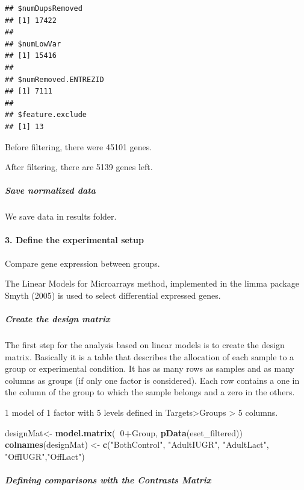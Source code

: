 \documentclass[]{article}
\newenvironment{Shaded}{\begin{snugshade}}{\end{snugshade}}
\newcommand{\KeywordTok}[1]{\textcolor[rgb]{0.13,0.29,0.53}{\textbf{#1}}}
\newcommand{\DecValTok}[1]{\textcolor[rgb]{0.00,0.00,0.81}{#1}}
\newcommand{\StringTok}[1]{\textcolor[rgb]{0.31,0.60,0.02}{#1}}
\newcommand{\OperatorTok}[1]{\textcolor[rgb]{0.81,0.36,0.00}{\textbf{#1}}}
\newcommand{\NormalTok}[1]{#1}
\let\oldparagraph\paragraph
\renewcommand{\paragraph}[1]{\oldparagraph{#1}\mbox{}}
\let\oldsubparagraph\subparagraph
\renewcommand{\subparagraph}[1]{\oldsubparagraph{#1}\mbox{}}
\begin{document}
\begin{verbatim}
## $numDupsRemoved
## [1] 17422
## 
## $numLowVar
## [1] 15416
## 
## $numRemoved.ENTREZID
## [1] 7111
## 
## $feature.exclude
## [1] 13
\end{verbatim}

Before filtering, there were 45101 genes.

After filtering, there are 5139 genes left.

\subparagraph{Save normalized data}\label{save-normalized-data}

We save data in results folder.

\paragraph{3. Define the experimental
setup}\label{define-the-experimental-setup}

Compare gene expression between groups.

The Linear Models for Microarrays method, implemented in the limma
package Smyth (2005) is used to select differential expressed genes.

\subparagraph{Create the design matrix}\label{create-the-design-matrix}

The first step for the analysis based on linear models is to create the
design matrix. Basically it is a table that describes the allocation of
each sample to a group or experimental condition. It has as many rows as
samples and as many columns as groups (if only one factor is
considered). Each row contains a one in the column of the group to which
the sample belongs and a zero in the others.

1 model of 1 factor with 5 levels defined in Targets\textgreater{}Groups
\textgreater{} 5 columns.

\begin{Shaded}
\begin{Highlighting}[]
\NormalTok{designMat<-}\StringTok{ }\KeywordTok{model.matrix}\NormalTok{(}\OperatorTok{~}\DecValTok{0}\OperatorTok{+}\NormalTok{Group, }\KeywordTok{pData}\NormalTok{(eset_filtered))}
\KeywordTok{colnames}\NormalTok{(designMat) <-}\StringTok{ }\KeywordTok{c}\NormalTok{(}\StringTok{"BothControl"}\NormalTok{, }\StringTok{"AdultIUGR"}\NormalTok{, }\StringTok{"AdultLact"}\NormalTok{, }\StringTok{"OffIUGR"}\NormalTok{,}\StringTok{"OffLact"}\NormalTok{)}
\end{Highlighting}
\end{Shaded}

\subparagraph{Defining comparisons with the Contrasts
Matrix}\label{defining-comparisons-with-the-contrasts-matrix}
\end{document}
